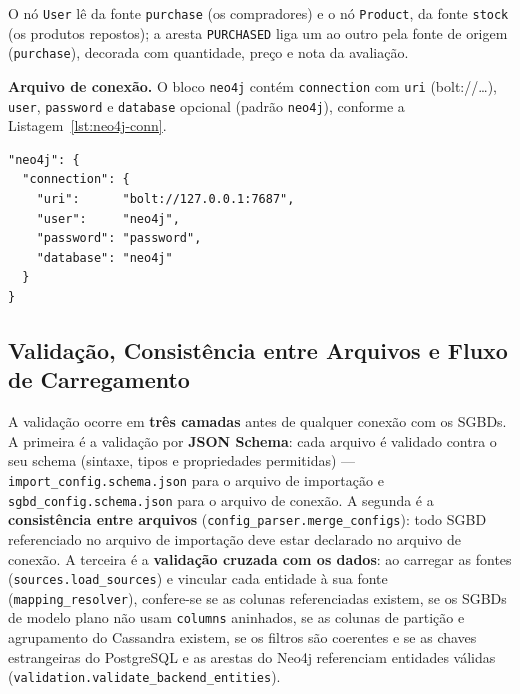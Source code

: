 O nó \texttt{User} lê da fonte \texttt{purchase} (os compradores) e o nó \texttt{Product},
da fonte \texttt{stock} (os produtos repostos); a aresta \texttt{PURCHASED} liga um ao
outro pela fonte de origem (\texttt{purchase}), decorada com quantidade, preço e nota da
avaliação.

\textbf{Arquivo de conexão.} O bloco \texttt{neo4j} contém \texttt{connection}
com \texttt{uri} (bolt://\ldots), \texttt{user}, \texttt{password} e
\texttt{database} opcional (padrão \texttt{neo4j}), conforme a
Listagem~\ref{lst:neo4j-conn}.

\begin{lstlisting}[style=jsonstyle,caption={Fragmento de conexão Neo4j.},label={lst:neo4j-conn}]
"neo4j": {
  "connection": {
    "uri":      "bolt://127.0.0.1:7687",
    "user":     "neo4j",
    "password": "password",
    "database": "neo4j"
  }
}
\end{lstlisting}

\subsection{Validação, Consistência entre Arquivos e Fluxo de Carregamento}
\label{sec:validacao}

A validação ocorre em \textbf{três camadas} antes de qualquer conexão com os SGBDs. A
primeira é a validação por \textbf{JSON Schema}: cada arquivo é validado contra o seu
schema (sintaxe, tipos e propriedades permitidas) --- \texttt{import\_config.schema.json}
para o arquivo de importação e \texttt{sgbd\_config.schema.json} para o arquivo de
conexão. A segunda é a \textbf{consistência entre arquivos}
(\texttt{config\_parser.merge\_configs}): todo SGBD referenciado no arquivo
de importação deve estar declarado no arquivo de conexão. A terceira é a
\textbf{validação cruzada com os dados}: ao carregar as fontes
(\texttt{sources.load\_sources}) e vincular cada entidade à sua fonte
(\texttt{mapping\_resolver}), confere-se se as colunas referenciadas existem, se os SGBDs
de modelo plano não usam \texttt{columns} aninhados, se as colunas de partição e
agrupamento do Cassandra existem, se os filtros são coerentes e se as chaves estrangeiras
do PostgreSQL e as arestas do Neo4j referenciam entidades válidas
(\texttt{validation.validate\_backend\_entities}).

